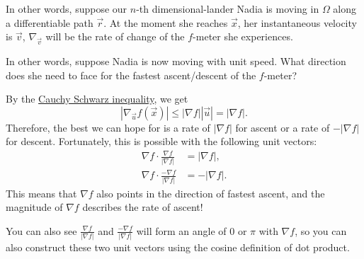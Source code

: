 In other words, suppose our $n$-th dimensional-lander Nadia is moving in $\Omega$ along a differentiable path $\vec{r}$. At the moment she reaches $\vec{x}$, her instantaneous velocity is $\vec{v}$, $\nabla_{\vec{v}}$ will be the rate of change of the $f$-meter she experiences. 

In other words, suppose Nadia is now moving with unit speed. What direction does she need to face for the fastest ascent/descent of the $f$-meter?

By the \hyperref[thm:cauchyschwarz]{Cauchy Schwarz inequality}, we get \[
|\nabla_{\vec{u}}f (\vec{x})| \leq |\nabla f||\vec{u}| = |\nabla f|.
\]
Therefore, the best we can hope for is a rate of $|\nabla f|$ for ascent or a rate of $-|\nabla f|$ for descent. Fortunately, this is possible with the following unit vectors: \begin{align*}
    \nabla f \cdot \frac{\nabla f}{|\nabla f|} &= |\nabla f|,\\
    \nabla f \cdot \frac{-\nabla f}{|\nabla f|}&= -|\nabla f|.
\end{align*}
This means that $\nabla f$ also points in the direction of fastest ascent, and the magnitude of $\nabla f$ describes the rate of ascent! 
\begin{remark}
    You can also see $\frac{\nabla f}{|\nabla f|} $ and $ \frac{-\nabla f}{|\nabla f|} $ will form an angle of $0$ or $\pi$ with $\nabla f$, so you can also construct these two unit vectors using the cosine definition of dot product.
\end{remark}

